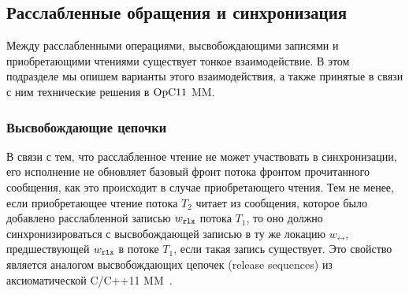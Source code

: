 \subsection{Расслабленные обращения и синхронизация}
Между расслабленными операциями, высвобождающими записями и
приобретающими чтениями существует тонкое взаимодействие.
В этом подразделе мы опишем варианты этого взаимодействия, а также
принятые в связи с ним технические решения в $\mathrm{OpC11}$ MM.

\subsubsection{Высвобождающие цепочки}
\label{sec:opc11:releaseseq}
В связи с тем, что расслабленное чтение не может участвовать в синхронизации,
его исполнение не обновляет базовый фронт потока фронтом прочитанного сообщения,
как это происходит в случае приобретающего чтения.
Тем не менее, если приобретающее чтение потока $T_2$ читает из сообщения, которое
было добавлено расслабленной записью $w_{\mathtt{rlx}}$ потока $T_1$, то оно должно синхронизироваться
с высвобождающей записью в ту же локацию $w_{\rel}$, предшествующей $w_{\mathtt{rlx}}$ в потоке $T_1$,
если такая запись существует.
Это свойство является аналогом высвобождающих цепочек (release sequences) из аксиоматической
C/C++11 MM~\cite{Batty-al:POPL11}.

